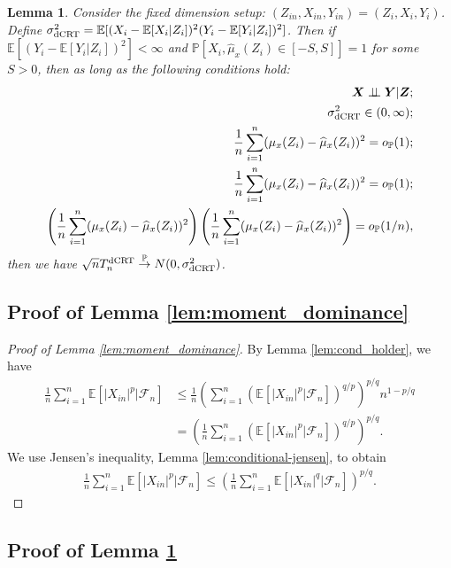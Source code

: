 \documentclass[12pt]{article}
\newtheorem{lemma}{Lemma}
\theoremstyle{definition}
\newcommand{\indep}{\perp \!\!\! \perp}
\def\P{\mathbb{P}}
\def\P{\mathbb{P}}
\newcommand{\E}{\mathbb E}								%
\renewcommand{\P}{\mathbb{P}}							%
\newcommand{\convp}{\overset{\mathbb{P}}{\rightarrow}}             %
\newcommand{\prx}{\bm X}								%
\newcommand{\srx}{X}									%
\newcommand{\prz}{\bm Z}								%
\newcommand{\srz}{Z}									%
\newcommand{\pry}{{\bm Y}}								%
\newcommand{\sry}{Y}									%
\newcommand{\dCRT}{\textnormal{dCRT}} 					%
\begin{document}
\begin{lemma}\label{lem:dCRT_convergence}
  Consider the fixed dimension setup: $(\srz_{in},\srx_{in},\sry_{in})=(\srz_{i},\srx_{i},\sry_{i})$. Define $\sigma_{\dCRT}^2=\E[(\srx_i-\E[\srx_i|\srz_i])^2(\sry_i-\E[\sry_i|\srz_i])^2]$. Then if $\E[(\sry_i-\E[\sry_i|\srz_i])^2]<\infty$ and $\P[\srx_i,\widehat{\mu}_x(\srz_i)\in [-S,S]]=1$ for some $S>0$, then as long as the following conditions hold:
  \begin{align*}
    \prx\indep\pry|\prz;\\
    \sigma_{\dCRT}^2\in (0,\infty);\\
    \frac{1}{n}\sum_{i=1}^n (\mu_{x}(\srz_i)-\widehat\mu_{x}(\srz_i))^2=o_{\P}(1);\\
    \frac{1}{n}\sum_{i=1}^n (\mu_{x}(\srz_i)-\widehat\mu_{x}(\srz_i))^2=o_{\P}(1);\\
    \left(\frac{1}{n}\sum_{i=1}^n (\mu_{x}(\srz_i)-\widehat\mu_{x}(\srz_i))^2\right)\left(
    \frac{1}{n}\sum_{i=1}^n (\mu_{x}(\srz_i)-\widehat\mu_{x}(\srz_i))^2\right)=o_{\P}(1/n),
  \end{align*}
  then we have $\sqrt{n}T_n^{\dCRT}\convp N(0,\sigma_{\dCRT}^2)$.
\end{lemma}

\subsection{Proof of Lemma \ref{lem:moment_dominance}}

\begin{proof}[Proof of Lemma \ref{lem:moment_dominance}]
  By Lemma \ref{lem:cond_holder}, we have
  \begin{align*}
    \frac{1}{n}\sum_{i=1}^n \E[|X_{in}|^{p}|\mathcal{F}_n]
    &
    \leq 
    \frac{1}{n}\left(\sum_{i=1}^n \left(\E[|X_{in}|^{p}|\mathcal{F}_n]\right)^{q/p}\right)^{p/q}n^{1-p/q}\\
    &
    =\left(\frac{1}{n}\sum_{i=1}^n \left(\E[|X_{in}|^{p}|\mathcal{F}_n]\right)^{q/p}\right)^{p/q}.
  \end{align*}
  We use Jensen's inequality, Lemma \ref{lem:conditional-jensen}, to obtain
  \begin{align*}
    \frac{1}{n}\sum_{i=1}^n \E[|X_{in}|^{p}|\mathcal{F}_n]\leq \left(\frac{1}{n}\sum_{i=1}^n \E[|X_{in}|^{q}|\mathcal{F}_n]\right)^{p/q}.
  \end{align*}
\end{proof}

\subsection{Proof of Lemma \ref{lem:dCRT_convergence}}
\end{document}
